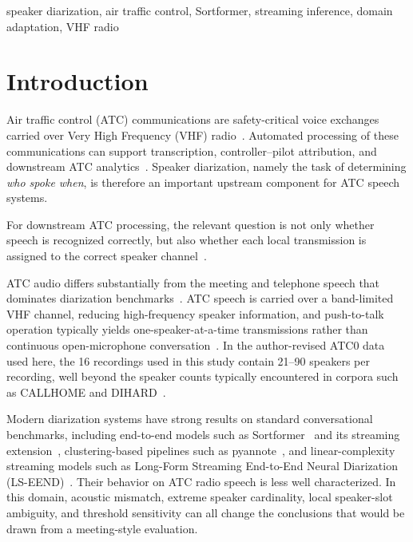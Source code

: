 \documentclass[conference]{IEEEtran}
\begin{document}
\begin{IEEEkeywords}
speaker diarization, air traffic control, Sortformer, streaming inference, domain adaptation, VHF radio
\end{IEEEkeywords}

\section{Introduction}
\label{sec:intro}

Air traffic control (ATC) communications are safety-critical voice exchanges carried over Very High Frequency (VHF) radio~\cite{wang2024enhancing, pan2024atcsd}. Automated processing of these communications can support transcription, controller--pilot attribution, and downstream ATC analytics~\cite{wang2024enhancing, zuluaga2022bertraffic}. Speaker diarization, namely the task of determining \emph{who spoke when}, is therefore an important upstream component for ATC speech systems.

For downstream ATC processing, the relevant question is not only whether speech is recognized correctly, but also whether each local transmission is assigned to the correct speaker channel~\cite{wang2024enhancing, zuluaga2022bertraffic}.

ATC audio differs substantially from the meeting and telephone speech that dominates diarization benchmarks~\cite{park2022review, pan2024atcsd}. ATC speech is carried over a band-limited VHF channel, reducing high-frequency speaker information, and push-to-talk operation typically yields one-speaker-at-a-time transmissions rather than continuous open-microphone conversation~\cite{wang2024enhancing, pan2024atcsd}. In the author-revised ATC0 data~\cite{godfrey1994atcc} used here, the 16 recordings used in this study contain 21--90 speakers per recording, well beyond the speaker counts typically encountered in corpora such as CALLHOME and DIHARD~\cite{callhome, ryant2021dihard}.

Modern diarization systems have strong results on standard conversational benchmarks, including end-to-end models such as Sortformer~\cite{park2024sortformer} and its streaming extension~\cite{medennikov2025streaming}, clustering-based pipelines such as pyannote~\cite{bredin2023pyannote}, and linear-complexity streaming models such as Long-Form Streaming End-to-End Neural Diarization (LS-EEND)~\cite{liang2024lseend}. Their behavior on ATC radio speech is less well characterized. In this domain, acoustic mismatch, extreme speaker cardinality, local speaker-slot ambiguity, and threshold sensitivity can all change the conclusions that would be drawn from a meeting-style evaluation.
\end{document}
